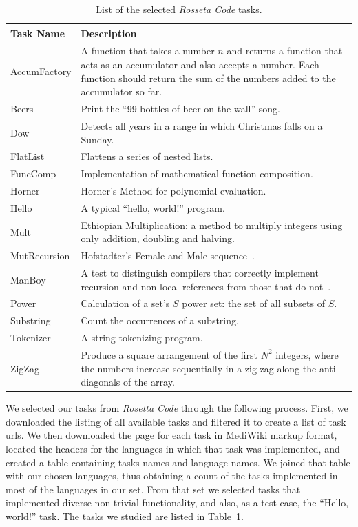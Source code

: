 \documentclass[10pt]{sigplanconf}
\begin{document}
\begin{table}
\begin{center}
\begin{tabular}{ l p{5cm}}
Task Name & Description\\
\hline
AccumFactory & A function that takes a number $n$ and returns a function that acts as an accumulator and also accepts a number. Each function should return the sum of the numbers added to the accumulator so far.\\
Beers & Print the ``99 bottles of beer on the wall'' song.\\
Dow & Detects all years in a range in which Christmas falls on a Sunday.\\
FlatList & Flattens a series of nested lists.\\
FuncComp & Implementation of mathematical function composition.\\
Horner & Horner's Method for polynomial evaluation.\\
Hello & A typical ``hello, world!'' program.\\
Mult & Ethiopian Multiplication: a method to multiply integers using only addition, doubling and halving.\\
MutRecursion & Hofstadter's Female and Male sequence~\cite{Hof89}.\\
ManBoy & A test to distinguish compilers that correctly implement
recursion and non-local references from those that do not~\cite{Knu64}.  \\
Power & Calculation of a set's $S$ power set: the set of all subsets of $S$.\\
Substring & Count the occurrences of a substring.\\
Tokenizer & A string tokenizing program.\\
ZigZag & Produce a square arrangement of the first $N^2$ integers,
where the numbers increase sequentially in a zig-zag along the anti-diagonals of the array.\\
\end{tabular}
\end{center}
\caption{List of the selected {\em Rosseta Code} tasks.}
\label{tab:tasks}
\end{table}

We selected our tasks from {\em Rosetta Code} through the following process.
First, we downloaded the listing of all available tasks and
filtered it to create a list of task {\sc url}s.
We then downloaded the page for each task in MediWiki markup format,
located the headers for the languages in which that task was implemented, and
created a table containing tasks names and language names.
We joined that table with our chosen languages,
thus obtaining a count of the tasks implemented in
most of the languages in our set.
From that set we selected tasks that implemented diverse
non-trivial functionality,
and also, as a test case, the ``Hello, world!'' task.
The tasks we studied are listed in Table~\ref{tab:tasks}.
\end{document}
